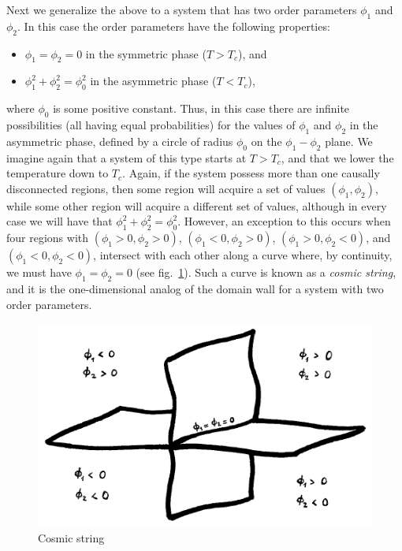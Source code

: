 Next we generalize the above to a system that has two order parameters $\phi_1$ and $\phi_2$. In this case the order parameters have the following properties:
\begin{itemize}
\item [] $\phi_1=\phi_2=0$ in the symmetric phase ($T>T_c$), and
\item [] $\phi_1^2+\phi_2^2=\phi_0^2$ in the asymmetric phase ($T<T_c$),
\end{itemize}
where $\phi_0$ is some positive constant. Thus, in this case there are infinite possibilities (all having equal probabilities) for the values of $\phi_1$ and $\phi_2$ in the asymmetric phase, defined by a circle of radius $\phi_0$ on the $\phi_1-\phi_2$ plane. We imagine again that a system of this type starts at $T>T_c$, and that we lower the temperature down to $T_c$. Again, if the system possess more than one causally disconnected regions, then some region will acquire a set of values $(\phi_1,\phi_2)$, while some other region will acquire a different set of values, although in every case we will have that $\phi_1^2+\phi_2^2=\phi_0^2$. However, an exception to this occurs when four regions with $(\phi_1>0,\phi_2>0)$, $(\phi_1<0,\phi_2>0)$, $(\phi_1>0,\phi_2<0)$, and $(\phi_1<0,\phi_2<0)$, intersect with each other along a curve where, by continuity, we must have $\phi_1=\phi_2=0$ (see fig.\ \ref{fig:lec12_8}). Such a curve is known as a {\it cosmic string}, and it is the one-dimensional analog of the 
domain wall for a system with two order parameters.
\begin{figure}[ht]
\begin{center}
\includegraphics[scale=0.6]{Draw/lec12_8.png}
\end{center}
\caption{Cosmic string}
\label{fig:lec12_8}
\end{figure}

